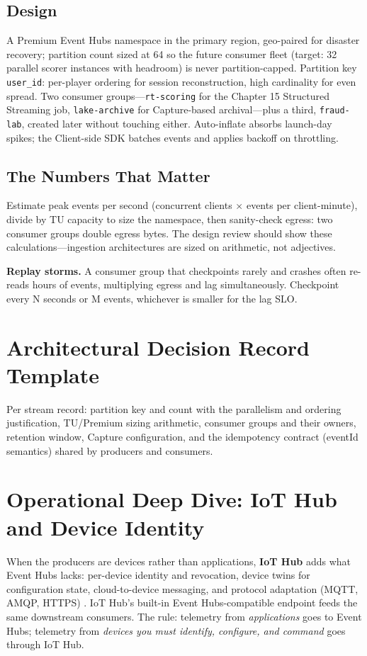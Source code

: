 \subsection{Design}
A Premium Event Hubs namespace in the primary region, geo-paired for disaster recovery; partition count sized at 64 so the future consumer fleet (target: 32 parallel scorer instances with headroom) is never partition-capped. Partition key \texttt{user\_id}: per-player ordering for session reconstruction, high cardinality for even spread. Two consumer groups---\texttt{rt-scoring} for the Chapter 15 Structured Streaming job, \texttt{lake-archive} for Capture-based archival---plus a third, \texttt{fraud-lab}, created later without touching either. Auto-inflate absorbs launch-day spikes; the Client-side SDK batches events and applies backoff on throttling.

\subsection{The Numbers That Matter}
Estimate peak events per second (concurrent clients $\times$ events per client-minute), divide by TU capacity to size the namespace, then sanity-check egress: two consumer groups double egress bytes. The design review should show these calculations---ingestion architectures are sized on arithmetic, not adjectives.

\begin{pitfall}
\textbf{Replay storms.} A consumer group that checkpoints rarely and crashes often re-reads hours of events, multiplying egress and lag simultaneously. Checkpoint every N seconds or M events, whichever is smaller for the lag SLO.
\end{pitfall}

\section{Architectural Decision Record Template}
Per stream record: partition key and count with the parallelism and ordering justification, TU/Premium sizing arithmetic, consumer groups and their owners, retention window, Capture configuration, and the idempotency contract (eventId semantics) shared by producers and consumers.

\section{Operational Deep Dive: IoT Hub and Device Identity}
When the producers are devices rather than applications, \textbf{IoT Hub} adds what Event Hubs lacks: per-device identity and revocation, device twins for configuration state, cloud-to-device messaging, and protocol adaptation (MQTT, AMQP, HTTPS) \cite{microsoft2025iothub}. IoT Hub's built-in Event Hubs-compatible endpoint feeds the same downstream consumers. The rule: telemetry from \emph{applications} goes to Event Hubs; telemetry from \emph{devices you must identify, configure, and command} goes through IoT Hub.


